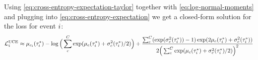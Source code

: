 Using \cref{eq:cross-entropy-expectation-taylor} together with \cref{eq:log-normal-moments} and plugging into \cref{eq:cross-entropy-expectation} we get a closed-form solution for the loss for event $i$:
\small
\begin{equation}
    \mathcal{L}_i^{\text{UCE}}
    \approx \mu_{c_i}(\tau_i^*) - \log \Big( \sum_c^C \exp(\mu_c(\tau_i^*) + \sigma_c^2(\tau_i^*) / 2) \Big) +
        \frac{\sum_c^C (\exp(\sigma_c^2(\tau_i^*)) - 1) \exp(2 \mu_c(\tau_i^*) + \sigma_c^2(\tau_i^*))}
        {2 \Big( \sum_c^C \exp(\mu_c(\tau_i^*) + \sigma_c^2(\tau_i^*) / 2) \Big)^2}
\end{equation}
\normalsize
